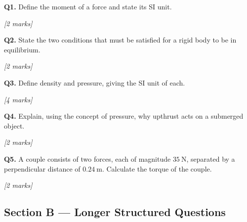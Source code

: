 \begin{tcolorbox}[colback=white, colframe=midblue, breakable]

\begin{minipage}{\linewidth}
\textbf{Q1.} Define the moment of a force and state its SI unit.
\par\hfill\textit{[2 marks]}
\vspace{2.5cm}
\end{minipage}

\begin{minipage}{\linewidth}
\textbf{Q2.} State the two conditions that must be satisfied for a rigid body to be in equilibrium.
\par\hfill\textit{[2 marks]}
\vspace{2.5cm}
\end{minipage}

\begin{minipage}{\linewidth}
\textbf{Q3.} Define density and pressure, giving the SI unit of each.
\par\hfill\textit{[4 marks]}
\vspace{3cm}
\end{minipage}

\begin{minipage}{\linewidth}
\textbf{Q4.} Explain, using the concept of pressure, why upthrust acts on a submerged object.
\par\hfill\textit{[2 marks]}
\vspace{3cm}
\end{minipage}

\begin{minipage}{\linewidth}
\textbf{Q5.} A couple consists of two forces, each of magnitude $35\ \text{N}$, separated by a perpendicular distance of $0.24\ \text{m}$. Calculate the torque of the couple.
\par\hfill\textit{[2 marks]}
\vspace{2.5cm}
\end{minipage}

\end{tcolorbox}

\subsection*{Section B — Longer Structured Questions}


